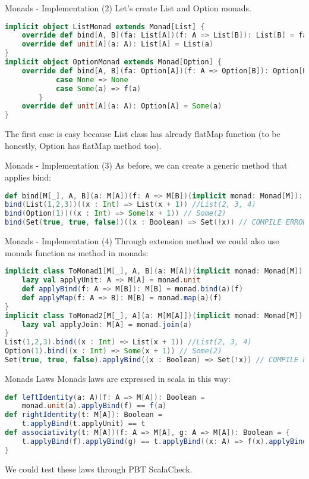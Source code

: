 \begin{frame}[fragile]{Monads - Implementation (2)}	
	Let's create List and Option monads.
\begin{lstlisting}[language=scala]
implicit object ListMonad extends Monad[List] {
	override def bind[A, B](fa: List[A])(f: A => List[B]): List[B] = fa.flatMap(f)
	override def unit[A](a: A): List[A] = List(a)
}
implicit object OptionMonad extends Monad[Option] {
	override def bind[A, B](fa: Option[A])(f: A => Option[B]): Option[B] = fa match {
			case None => None
			case Some(a) => f(a)
		}
	override def unit[A](a: A): Option[A] = Some(a)
}		
\end{lstlisting}		
	The first case is easy because List class has already flatMap function
	(to be honestly, Option has flatMap method too).
\end{frame}

\begin{frame}[fragile]{Monads - Implementation (3)}		
	As before, we can create a generic method that applies bind:
\begin{lstlisting}[language=scala]
def bind[M[_], A, B](a: M[A])(f: A => M[B])(implicit monad: Monad[M]): M[B] = monad.bind(a)(f)
bind(List(1,2,3))((x : Int) => List(x + 1)) //List(2, 3, 4)
bind(Option(1))((x : Int) => Some(x + 1)) // Some(2)
bind(Set(true, true, false))((x : Boolean) => Set(!x)) // COMPILE ERROR
\end{lstlisting}	
\end{frame}

\begin{frame}[fragile]{Monads - Implementation (4)}	
	Through extension method we could also use monads function as method in monads:
\begin{lstlisting}[language=scala]
implicit class ToMonad1[M[_], A, B](a: M[A])(implicit monad: Monad[M]) {
	lazy val applyUnit: A => M[A] = monad.unit	
	def applyBind(f: A => M[B]): M[B] = monad.bind(a)(f)	
	def applyMap(f: A => B): M[B] = monad.map(a)(f)
}
implicit class ToMonad2[M[_], A](a: M[M[A]])(implicit monad: Monad[M]) {
	lazy val applyJoin: M[A] = monad.join(a)
}
List(1,2,3).bind((x : Int) => List(x + 1)) //List(2, 3, 4)
Option(1).bind((x : Int) => Some(x + 1)) // Some(2)
Set(true, true, false).applyBind((x : Boolean) => Set(!x)) // COMPILE ERROR	
\end{lstlisting}	
\end{frame}

\begin{frame}[fragile]{Monads Laws}
	Monads laws are expressed in scala in this way:
\begin{lstlisting}[language=scala]
def leftIdentity(a: A)(f: A => M[A]): Boolean = 
	monad.unit(a).applyBind(f) == f(a)
def rightIdentity(t: M[A]): Boolean = 
	t.applyBind(t.applyUnit) == t
def associativity(t: M[A])(f: A => M[A], g: A => M[A]): Boolean = {
	t.applyBind(f).applyBind(g) == t.applyBind((x: A) => f(x).applyBind(g))
}
\end{lstlisting}	
	We could test these laws through PBT ScalaCheck.
\end{frame}

